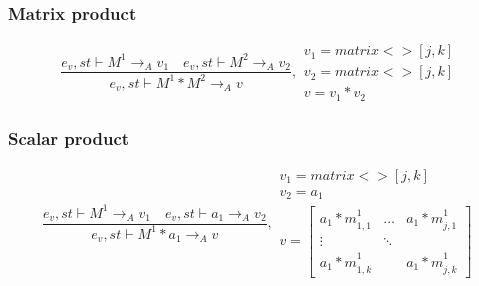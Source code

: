\subsubsection{Matrix product}
\begin{equation}
	\frac { { e }_{ v },st\vdash { M }^{ 1 }{ \rightarrow  }_{ A }{ v }_{ 1 }\quad { e }_{ v },st\vdash { M }^{ 2 }{ \rightarrow  }_{ A }{ v }_{ 2 } }{ { e }_{ v },st\vdash { M }^{ 1 }*{ M }^{ 2 }{ \rightarrow  }_{ A }{ v } } ,\begin{matrix} { v }_{ 1 }=matrix<>[j,k] \\ { v }_{ 2 }=matrix<>[j,k] \\ v={ v }_{ 1 }*{ v }_{ 2 } \end{matrix}
\end{equation}

\subsubsection{Scalar product}
\begin{equation}
	\frac { { e }_{ v },st\vdash { M }^{ 1 }{ \rightarrow  }_{ A }{ v }_{ 1 }\quad { e }_{ v },st\vdash { a }_{ 1 }{ \rightarrow  }_{ A }{ v }_{ 2 } }{ { e }_{ v },st\vdash { M }^{ 1 }\ast { a }_{ 1 }{ \rightarrow  }_{ A }{ v } } ,\begin{matrix} { v }_{ 1 }=matrix<>[j,k] \\ { v }_{ 2 }={ a }_{ 1 } \\ v=\begin{bmatrix} { { a }_{ 1 }*m }_{ 1,1 }^{ 1 } & \dots  & { { a }_{ 1 }*m }_{ j,1 }^{ 1 } \\ \vdots  & \ddots  &  \\ { { a }_{ 1 }*m }_{ 1,k }^{ 1 } &  & { { a }_{ 1 }*m }_{ j,k }^{ 1 } \end{bmatrix} \end{matrix}
\end{equation}

